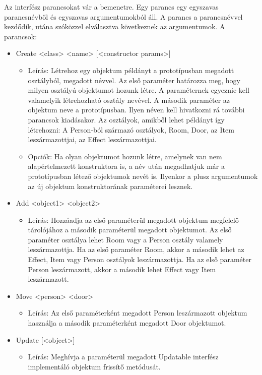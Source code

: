 Az interfész parancsokat vár a bemenetre. Egy parancs egy egyszavas parancsnévből és egyszavas argumentumokból áll. A parancs a parancsnévvel kezdődik, utána szóközzel elválasztva következnek az argumentumok. A parancsok:

\begin{itemize}
\item Create <class> <name> [<constructor params>]
    \begin{itemize}
        \item Leírás: Létrehoz egy objektum példányt a prototípusban megadott osztályból, megadott névvel. 
        Az első paraméter határozza meg, hogy milyen osztályú objektumot hozunk létre. A paraméternek egyeznie kell valamelyik létrehozható osztály nevével. A második paraméter az objektum neve a prototípusban. Ilyen néven kell hivatkozni rá további parancsok kiadásakor.
        Az osztályok, amikből lehet példányt így létrehozni: A Person-ból származó osztályok, Room, Door, az Item leszármazottjai, az Effect leszármazottjai.
        \item Opciók: Ha olyan objektumot hozunk létre, amelynek van nem alapértelmezett konstruktora is, a név után megadhatjuk már a prototípusban létező objektumok nevét is. Ilyenkor a plusz argumentumok az új objektum konstruktorának paraméterei lesznek.
    \end{itemize}
    \item Add <object1> <object2>
    \begin{itemize}
        \item Leírás: Hozzáadja az első paraméterül megadott objektum megfelelő tárolójához a második paraméterül megadott objektumot.
        Az első paraméter osztálya lehet Room vagy a Person osztály valamely leszármazottja. Ha az első paraméter Room, akkor a második lehet az Effect, Item vagy Person osztályok leszármazottja. Ha az első paraméter Person leszármazott, akkor a második lehet Effect vagy Item leszármazott.
    \end{itemize}
    \item Move <person> <door>
    \begin{itemize}
        \item Leírás: Az első paraméterként megadott Person leszármazott objektum használja a második paraméterként megadott Door objektumot.
    \end{itemize}
    \item Update [<object>]
    \begin{itemize}
        \item Leírás: Meghívja a paraméterül megadott Updatable interfész implementáló objektum frissítő metódusát.

\end{itemize}
\end{itemize}
